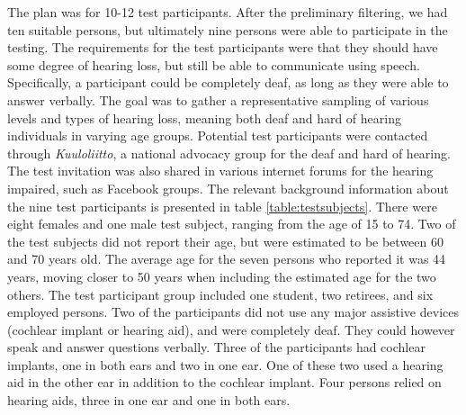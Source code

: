 \documentclass[english, 12pt, a4paper, pdftex, elec, utf8]{aaltothesis}
\begin{document}
The plan was for 10-12 test participants. After the preliminary filtering, we had ten suitable persons, but ultimately nine persons were able to participate in the testing. The requirements for the test participants were that they should have some degree of hearing loss, but still be able to communicate using speech. Specifically, a participant could be completely deaf, as long as they were able to answer verbally. The goal was to gather a representative sampling of various levels and types of hearing loss, meaning both deaf and hard of hearing individuals in varying age groups. Potential test participants were contacted through \textit{Kuuloliitto}, a national advocacy group for the deaf and hard of hearing. The test invitation was also shared in various internet forums for the hearing impaired, such as Facebook groups. The relevant background information about the nine test participants is presented in table \ref{table:testsubjects}. There were eight females and one male test subject, ranging from the age of 15 to 74. Two of the test subjects did not report their age, but were estimated to be between 60 and 70 years old. The average age for the seven persons who reported it was 44 years, moving closer to 50 years when including the estimated age for the two others. The test participant group included one student, two retirees, and six employed persons. Two of the participants did not use any major assistive devices (cochlear implant or hearing aid), and were completely deaf. They could however speak and answer questions verbally. Three of the participants had cochlear implants, one in both ears and two in one ear. One of these two used a hearing aid in the other ear in addition to the cochlear implant. Four persons relied on hearing aids, three in one ear and one in both ears. \\
\end{document}
